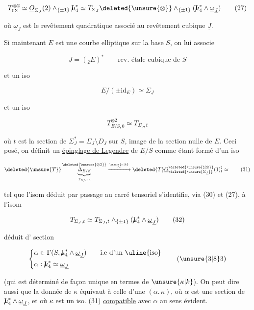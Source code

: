 \[
T_{0\Sigma}^{\otimes2}\simeq \underline O_{\Sigma_J}(2)\wedge_{\{\pm1\}}\mathord{\mathrm{I}\mkern-7mu\mu}_4^*
\simeq T_{\Sigma_J}\deleted{\unsure{\otimes}}\wedge_{\{\pm1\}}(\mathord{\mathrm{I}\mkern-7mu\mu}_4^*\wedge\underline\omega_{\underline J})
\tag*{(27)}
\]

où $\underline\omega_J$ est le revêtement  quadratique associé au revêtement  cubique $\underline J$.

Si maintenant $E$ est une courbe elliptique sur la base $S$, on lui associe

\[
\underline J=({}_2E)^*\qquad\text{rev. étale cubique de }S
\tag*{(28)}
\]

et  un iso

\[
E/(\pm\mathrm{id}_E)\simeq\Sigma_{\underline J}
\tag*{(29)}
\]

et un iso

\[
T_{E/S,0}^{\otimes2}\simeq T_{\Sigma_{\underline J},t}
\tag*{(30)}
\]

où $t$ est la section de $\Sigma_J^*=\Sigma_J\setminus D_J$ sur $S$, image de la section nulle de $E$. Ceci posé, on définit un \uline{épinglage de Legendre} de $E/S$ comme étant formé d'un iso

\[
\deleted{\unsure{T}}\underbrace{\Delta_{E/S}}_{T_{E/S,0}}^{\deleted{\unsure{\otimes2}}}
\xrightarrow{\overset{\unsure{\kappa|k}}{\sim}}
\deleted{T}\underline O_{\deleted{\unsure{\Sigma_{\underline J}}}}^{\deleted{\unsure{\natural|\otimes}}}(1)^{\natural}_t\simeq
\tag*{(31)}
\]

tel que  l'isom  déduit par passage au carré tensoriel s'identifie, via (30) et (27), à l'isom

\[
T_{\Sigma_J,t}\simeq T_{\Sigma_J,t}\wedge_{\{\pm1\}}(\mathord{\mathrm{I}\mkern-7mu\mu}_4^*\wedge\underline\omega_{\underline J})
\tag*{(32)}
\]

déduit d' section

\[
\left\{\begin{aligned}
&\alpha\in\Gamma(S,\mathord{\mathrm{I}\mkern-7mu\mu}_4^*\wedge\underline\omega_{\underline J})\qquad\text{i.e d'un \uline{iso}}\\
&\alpha:\mathord{\mathrm{I}\mkern-7mu\mu}_4^*\simeq\underline\omega_{\underline J}
\end{aligned}\right.
\tag*{(\unsure{3|8}3)}
\]

(qui est déterminé de façon unique en termes
de $\unsure{\kappa|k}$). On peut dire aussi que la donnée de $\kappa$ équivaut à celle d'une   $(\alpha.\,\kappa)$, où $\alpha$ est une section de $\mathord{\mathrm{I}\mkern-7mu\mu}_4^*\wedge\underline\omega_{\underline J}$, et où $\kappa$ est un iso. (31) \uline{compatible} avec $\alpha$ au sens évident.

